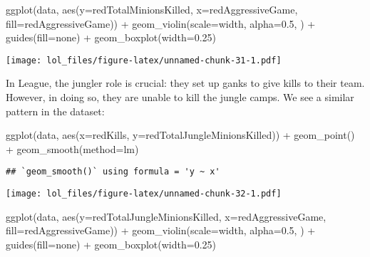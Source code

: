 \documentclass[
]{article}
\newenvironment{Shaded}{\begin{snugshade}}{\end{snugshade}}
\newcommand{\AttributeTok}[1]{\textcolor[rgb]{0.77,0.63,0.00}{#1}}
\newcommand{\FloatTok}[1]{\textcolor[rgb]{0.00,0.00,0.81}{#1}}
\newcommand{\FunctionTok}[1]{\textcolor[rgb]{0.00,0.00,0.00}{#1}}
\newcommand{\NormalTok}[1]{#1}
\newcommand{\SpecialCharTok}[1]{\textcolor[rgb]{0.00,0.00,0.00}{#1}}
\newcommand{\StringTok}[1]{\textcolor[rgb]{0.31,0.60,0.02}{#1}}
\begin{document}
\begin{Shaded}
\begin{Highlighting}[]
\FunctionTok{ggplot}\NormalTok{(data, }\FunctionTok{aes}\NormalTok{(}\AttributeTok{y=}\NormalTok{redTotalMinionsKilled, }\AttributeTok{x=}\NormalTok{redAggressiveGame, }\AttributeTok{fill=}\NormalTok{redAggressiveGame)) }\SpecialCharTok{+} 
  \FunctionTok{geom\_violin}\NormalTok{(}\AttributeTok{scale=}\StringTok{\textquotesingle{}width\textquotesingle{}}\NormalTok{, }\AttributeTok{alpha=}\FloatTok{0.5}\NormalTok{, ) }\SpecialCharTok{+}
  \FunctionTok{guides}\NormalTok{(}\AttributeTok{fill=}\StringTok{\textquotesingle{}none\textquotesingle{}}\NormalTok{) }\SpecialCharTok{+} 
  \FunctionTok{geom\_boxplot}\NormalTok{(}\AttributeTok{width=}\FloatTok{0.25}\NormalTok{)}
\end{Highlighting}
\end{Shaded}

\texttt{[image: lol\_files/figure-latex/unnamed-chunk-31-1.pdf]}

In League, the jungler role is crucial: they set up ganks to give kills
to their team. However, in doing so, they are unable to kill the jungle
camps. We see a similar pattern in the dataset:

\begin{Shaded}
\begin{Highlighting}[]
\FunctionTok{ggplot}\NormalTok{(data, }\FunctionTok{aes}\NormalTok{(}\AttributeTok{x=}\NormalTok{redKills, }\AttributeTok{y=}\NormalTok{redTotalJungleMinionsKilled)) }\SpecialCharTok{+} 
  \FunctionTok{geom\_point}\NormalTok{() }\SpecialCharTok{+}
  \FunctionTok{geom\_smooth}\NormalTok{(}\AttributeTok{method=}\StringTok{\textquotesingle{}lm\textquotesingle{}}\NormalTok{)}
\end{Highlighting}
\end{Shaded}

\begin{verbatim}
## `geom_smooth()` using formula = 'y ~ x'
\end{verbatim}

\texttt{[image: lol\_files/figure-latex/unnamed-chunk-32-1.pdf]}

\begin{Shaded}
\begin{Highlighting}[]
\FunctionTok{ggplot}\NormalTok{(data, }\FunctionTok{aes}\NormalTok{(}\AttributeTok{y=}\NormalTok{redTotalJungleMinionsKilled, }\AttributeTok{x=}\NormalTok{redAggressiveGame, }\AttributeTok{fill=}\NormalTok{redAggressiveGame)) }\SpecialCharTok{+} 
  \FunctionTok{geom\_violin}\NormalTok{(}\AttributeTok{scale=}\StringTok{\textquotesingle{}width\textquotesingle{}}\NormalTok{, }\AttributeTok{alpha=}\FloatTok{0.5}\NormalTok{, ) }\SpecialCharTok{+}
  \FunctionTok{guides}\NormalTok{(}\AttributeTok{fill=}\StringTok{\textquotesingle{}none\textquotesingle{}}\NormalTok{) }\SpecialCharTok{+} 
  \FunctionTok{geom\_boxplot}\NormalTok{(}\AttributeTok{width=}\FloatTok{0.25}\NormalTok{)}
\end{Highlighting}
\end{Shaded}
\end{document}
